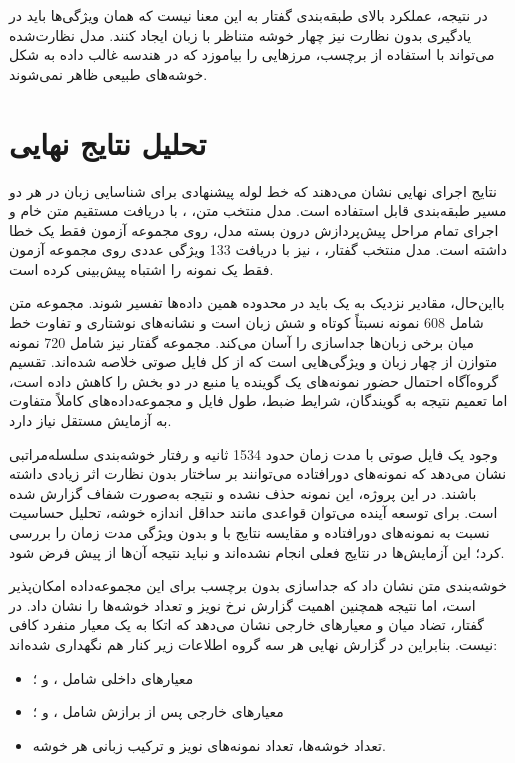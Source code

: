 \documentclass[12pt,a4paper,oneside]{report}
\begin{document}
در نتیجه، عملکرد بالای طبقه‌بندی گفتار به این معنا نیست که همان ویژگی‌ها باید در یادگیری بدون نظارت نیز چهار خوشه متناظر با زبان ایجاد کنند. مدل نظارت‌شده می‌تواند با استفاده از برچسب، مرزهایی را بیاموزد که در هندسه غالب داده به شکل خوشه‌های طبیعی ظاهر نمی‌شوند.


\section{تحلیل نتایج نهایی}

نتایج اجرای نهایی نشان می‌دهند که خط لوله پیشنهادی برای شناسایی زبان در هر دو مسیر طبقه‌بندی قابل استفاده است. مدل منتخب متن،
،
با دریافت مستقیم متن خام و اجرای تمام مراحل پیش‌پردازش درون بسته مدل، روی مجموعه آزمون فقط یک خطا داشته است. مدل منتخب گفتار،
،
نیز با دریافت 133 ویژگی عددی روی مجموعه آزمون فقط یک نمونه را اشتباه پیش‌بینی کرده است.

بااین‌حال، مقادیر نزدیک به یک باید در محدوده همین داده‌ها تفسیر شوند. مجموعه متن شامل 608 نمونه نسبتاً کوتاه و شش زبان است و نشانه‌های نوشتاری و تفاوت خط میان برخی زبان‌ها جداسازی را آسان می‌کند. مجموعه گفتار نیز شامل 720 نمونه متوازن از چهار زبان و ویژگی‌هایی است که از کل فایل صوتی خلاصه شده‌اند. تقسیم گروه‌آگاه احتمال حضور نمونه‌های یک گوینده یا منبع در دو بخش را کاهش داده است، اما تعمیم نتیجه به گویندگان، شرایط ضبط، طول فایل و مجموعه‌داده‌های کاملاً متفاوت به آزمایش مستقل نیاز دارد.

وجود یک فایل صوتی با مدت زمان حدود 1534 ثانیه و رفتار خوشه‌بندی سلسله‌مراتبی نشان می‌دهد که نمونه‌های دورافتاده می‌توانند بر ساختار بدون نظارت اثر زیادی داشته باشند. در این پروژه، این نمونه حذف نشده و نتیجه به‌صورت شفاف گزارش شده است. برای توسعه آینده می‌توان قواعدی مانند حداقل اندازه خوشه، تحلیل حساسیت نسبت به نمونه‌های دورافتاده و مقایسه نتایج با و بدون ویژگی مدت زمان را بررسی کرد؛ این آزمایش‌ها در نتایج فعلی انجام نشده‌اند و نباید نتیجه آن‌ها از پیش فرض شود.

خوشه‌بندی متن نشان داد که جداسازی بدون برچسب برای این مجموعه‌داده امکان‌پذیر است، اما نتیجه
همچنین اهمیت گزارش نرخ نویز و تعداد خوشه‌ها را نشان داد. در گفتار، تضاد میان
و معیارهای خارجی نشان می‌دهد که اتکا به یک معیار منفرد کافی نیست. بنابراین در گزارش نهایی هر سه گروه اطلاعات زیر کنار هم نگهداری شده‌اند:

\begin{itemize}
	\item معیارهای داخلی شامل ،  و ؛
	\item معیارهای خارجی پس از برازش شامل ،  و ؛
	\item تعداد خوشه‌ها، تعداد نمونه‌های نویز و ترکیب زبانی هر خوشه.
\end{itemize}
\end{document}
